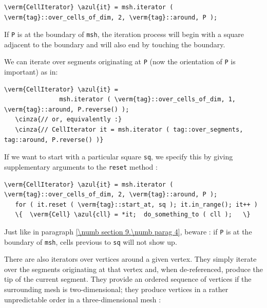 \begin{Verbatim}[commandchars=\\\{\},formatcom=\small\tt,
   baselinestretch=0.94,framesep=2mm                      ]
   \verm{CellIterator} \azul{it} = msh.iterator ( \verm{tag}::over_cells_of_dim, 2, \verm{tag}::around, P );
\end{Verbatim}

If {\small\tt P} is at the boundary of {\small\tt msh}, the iteration process will begin
with a square adjacent to the boundary and will also end by touching the boundary.

We can iterate over segments originating at {\small\tt P} (now the orientation of
{\small\tt P} is important) as in:

\begin{Verbatim}[commandchars=\\\{\},formatcom=\small\tt,
   baselinestretch=0.94,framesep=2mm                      ]
   \verm{CellIterator} \azul{it} = 
               msh.iterator ( \verm{tag}::over_cells_of_dim, 1, \verm{tag}::around, P.reverse() );
   \cinza{// or, equivalently :}
   \cinza{// CellIterator it = msh.iterator ( tag::over_segments, tag::around, P.reverse() )}
\end{Verbatim}

If we want to start with a particular square {\small\tt sq}, we specify this by giving
supplementary arguments to the {\small\tt reset} method :

\begin{Verbatim}[commandchars=\\\{\},formatcom=\small\tt,
   baselinestretch=0.94,framesep=2mm                      ]
   \verm{CellIterator} \azul{it} = msh.iterator ( \verm{tag}::over_cells_of_dim, 2, \verm{tag}::around, P );
   for ( it.reset ( \verm{tag}::start_at, sq ); it.in_range(); it++ )
   \{  \verm{Cell} \azul{cll} = *it;  do_something_to ( cll );   \}
\end{Verbatim}

Just like in paragraph \ref{\numb section 9.\numb parag 4}, beware : if {\small\tt P}
is at the boundary of {\small\tt msh}, cells previous to {\small\tt sq} will not
show up.

There are also iterators over vertices around a given vertex.
They simply iterate over the segments originating at that vertex and,
when de-referenced, produce the tip of the current segment.
They provide an ordered sequence of vertices if the surrounding mesh is two-dimensional;
they produce vertices in a rather unpredictable order in a three-dimensional mesh :

